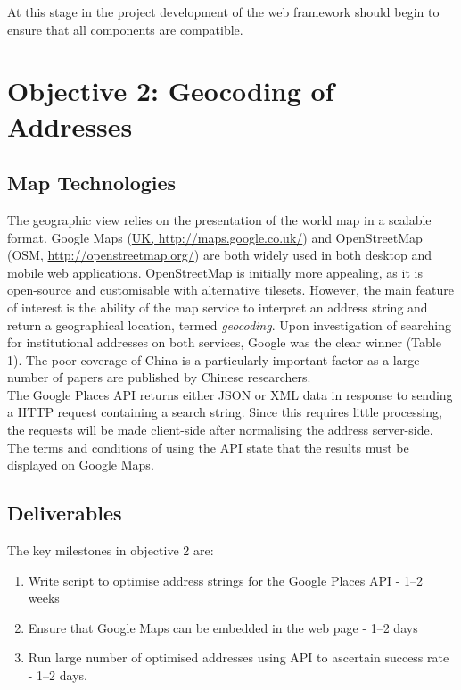 \documentclass[PROP_AGutteridge_CS.tex]{subfiles}
\begin{document}
\noindent At this stage in the project development of the web framework should begin to ensure that all components are compatible. 

\section{Objective 2: Geocoding of Addresses}
\subsection{Map Technologies}
The geographic view relies on the presentation of the world map in a scalable format. Google Maps (\url{UK, http://maps.google.co.uk/}) and OpenStreetMap (OSM, \url{http://openstreetmap.org/}) are both widely used in both desktop and mobile web applications. OpenStreetMap is initially more appealing, as it is open-source and customisable with alternative tilesets. However, the main feature of interest is the ability of the map service to interpret an address string and return a geographical location, termed \emph{geocoding}\cite{davis}. Upon investigation of searching for institutional addresses on both services, Google was the clear winner (Table 1). The poor coverage of China is a particularly important factor as a large number of papers are published by Chinese researchers. \\

\noindent The Google Places API returns either JSON or XML data in response to sending a HTTP request containing a search string. Since this requires little processing, the requests will be made client-side after normalising the address server-side. The terms and conditions of using the API state that the results must be displayed on Google Maps\cite{google-terms}.

\subsection{Deliverables}
The key milestones in objective 2 are:
\begin{enumerate}
\item{Write script to optimise address strings for the Google Places API - 1--2 weeks}
\item{Ensure that Google Maps can be embedded in the web page - 1--2 days}
\item{Run large number of optimised addresses using API to ascertain success rate - 1--2 days.}
\end{enumerate}\newpage
\end{document}
